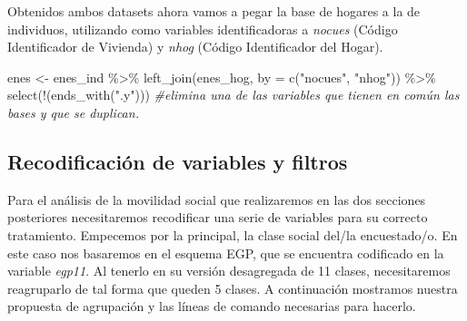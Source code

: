 \documentclass[
]{book}
\newenvironment{Shaded}{\begin{snugshade}}{\end{snugshade}}
\newcommand{\AttributeTok}[1]{\textcolor[rgb]{0.77,0.63,0.00}{#1}}
\newcommand{\CommentTok}[1]{\textcolor[rgb]{0.56,0.35,0.01}{\textit{#1}}}
\newcommand{\FunctionTok}[1]{\textcolor[rgb]{0.00,0.00,0.00}{#1}}
\newcommand{\NormalTok}[1]{#1}
\newcommand{\OtherTok}[1]{\textcolor[rgb]{0.56,0.35,0.01}{#1}}
\newcommand{\SpecialCharTok}[1]{\textcolor[rgb]{0.00,0.00,0.00}{#1}}
\newcommand{\StringTok}[1]{\textcolor[rgb]{0.31,0.60,0.02}{#1}}
\begin{document}
Obtenidos ambos datasets ahora vamos a pegar la base de hogares a la de individuos, utilizando como variables identificadoras a \emph{nocues} (Código Identificador de Vivienda) y \emph{nhog} (Código Identificador del Hogar).

\begin{Shaded}
\begin{Highlighting}[]
\NormalTok{enes }\OtherTok{\textless{}{-}}\NormalTok{ enes\_ind }\SpecialCharTok{\%\textgreater{}\%}
    \FunctionTok{left\_join}\NormalTok{(enes\_hog, }\AttributeTok{by =} \FunctionTok{c}\NormalTok{(}\StringTok{"nocues"}\NormalTok{, }\StringTok{"nhog"}\NormalTok{)) }\SpecialCharTok{\%\textgreater{}\%} 
    \FunctionTok{select}\NormalTok{(}\SpecialCharTok{!}\NormalTok{(}\FunctionTok{ends\_with}\NormalTok{(}\StringTok{".y"}\NormalTok{))) }\CommentTok{\#elimina una de las variables que tienen en común las bases y que se duplican.}
\end{Highlighting}
\end{Shaded}

\hypertarget{recodificaciuxf3n-de-variables-y-filtros}{%
\subsection{Recodificación de variables y filtros}\label{recodificaciuxf3n-de-variables-y-filtros}}

Para el análisis de la movilidad social que realizaremos en las dos secciones posteriores necesitaremos recodificar una serie de variables para su correcto tratamiento. Empecemos por la principal, la clase social del/la encuestado/o. En este caso nos basaremos en el esquema EGP, que se encuentra codificado en la variable \emph{egp11}. Al tenerlo en su versión desagregada de 11 clases, necesitaremos reagruparlo de tal forma que queden 5 clases. A continuación mostramos nuestra propuesta de agrupación y las líneas de comando necesarias para hacerlo.
\end{document}
